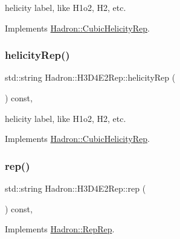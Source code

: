 helicity label, like H1o2, H2, etc. 

Implements \mbox{\hyperlink{structHadron_1_1CubicHelicityRep_af1096946b7470edf0a55451cc662f231}{Hadron\+::\+Cubic\+Helicity\+Rep}}.

\mbox{\label{structHadron_1_1H3D4E2Rep_a9b041630539536a249a5a6cae0fdb0d4}} 
\subsubsection{\texorpdfstring{helicityRep()}{helicityRep()}\hspace{0.1cm}{\footnotesize\ttfamily [3/3]}}
{\footnotesize\ttfamily std\+::string Hadron\+::\+H3\+D4\+E2\+Rep\+::helicity\+Rep (\begin{DoxyParamCaption}{ }\end{DoxyParamCaption}) const\hspace{0.3cm}{\ttfamily [inline]}, {\ttfamily [virtual]}}

helicity label, like H1o2, H2, etc. 

Implements \mbox{\hyperlink{structHadron_1_1CubicHelicityRep_af1096946b7470edf0a55451cc662f231}{Hadron\+::\+Cubic\+Helicity\+Rep}}.

\mbox{\label{structHadron_1_1H3D4E2Rep_ab0cffc17ffd30d135328751bad30c549}} 
\subsubsection{\texorpdfstring{rep()}{rep()}\hspace{0.1cm}{\footnotesize\ttfamily [1/5]}}
{\footnotesize\ttfamily std\+::string Hadron\+::\+H3\+D4\+E2\+Rep\+::rep (\begin{DoxyParamCaption}{ }\end{DoxyParamCaption}) const\hspace{0.3cm}{\ttfamily [inline]}, {\ttfamily [virtual]}}



Implements \mbox{\hyperlink{structHadron_1_1RepRep_ab3213025f6de249f7095892109575fde}{Hadron\+::\+Rep\+Rep}}.

\mbox{\label{structHadron_1_1H3D4E2Rep_ab0cffc17ffd30d135328751bad30c549}} 
